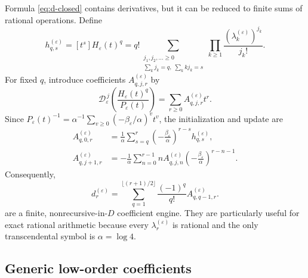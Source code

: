 \documentclass[11pt,a4paper]{article}
\theoremstyle{clean}
\theoremstyle{definition}
\newcommand{\eps}{\varepsilon}
\newcommand{\al}{\alpha}
\newcommand{\be}{\beta}
\newcommand{\Coeff}[2]{\left[#1\right]#2}
\newcommand{\Dop}{\mathscr D}
\begin{document}
Formula \cref{eq:d-closed} contains derivatives, but it can be reduced to finite sums of rational operations.  Define
\begin{equation}
 h_{q,s}^{(\eps)}=\Coeff{t^s}{H_\eps(t)^q}
 =q!\!\sum_{\substack{j_1,j_2,\ldots\ge0\\
              \sum_kj_k=q,\;\sum_kkj_k=s}}
 \prod_{k\ge1}\frac{(\lambda_k^{(\eps)})^{j_k}}{j_k!}.
 \label{eq:hqs}
\end{equation}
For fixed \(q\), introduce coefficients \(A_{q,j,r}^{(\eps)}\) by
\begin{equation}
 \Dop_\eps^{\,j}\!\left(\frac{H_\eps(t)^q}{P_\eps(t)}\right)
 =\sum_{r\ge0}A_{q,j,r}^{(\eps)}t^r.
 \label{eq:Aqjr-def}
\end{equation}
Since
\(
 P_\eps(t)^{-1}=\al^{-1}\sum_{v\ge0}(-\be_\eps/\al)^v t^v
\), the initialization and update are
\begin{align}
 A_{q,0,r}^{(\eps)}
 &=\frac1\al\sum_{s=q}^r
 \left(-\frac{\be_\eps}{\al}\right)^{r-s}h_{q,s}^{(\eps)},
 \label{eq:A-initial}\\
 A_{q,j+1,r}^{(\eps)}
 &=-\frac1\al\sum_{n=0}^{r-1}
 nA_{q,j,n}^{(\eps)}
 \left(-\frac{\be_\eps}{\al}\right)^{r-n-1}.
 \label{eq:A-update}
\end{align}
Consequently,
\begin{equation}
 \boxed{\displaystyle
 d_r^{(\eps)}=
 \sum_{q=1}^{\lfloor(r+1)/2\rfloor}
 \frac{(-1)^q}{q!}A_{q,q-1,r}^{(\eps)}.}
 \label{eq:d-array}
\end{equation}
 are a finite, nonrecursive-in-\(D\) coefficient engine.  They are particularly useful for exact rational arithmetic because every \(\lambda_r^{(\eps)}\) is rational and the only transcendental symbol is \(\al=\log4\).

\subsection{Generic low-order coefficients}
\end{document}
